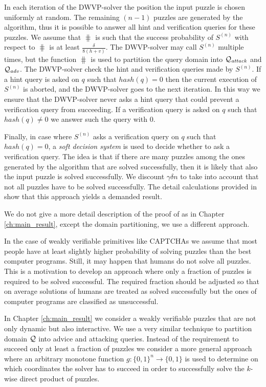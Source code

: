 In each iteration of the DWVP-solver the position the input puzzle is chosen uniformly at random.
The remaining $(n-1)$ puzzles are generated by the algorithm, thus it is possible to answer
all hint and verification queries for these puzzles.
We assume that $\hash$ is such that the success probability of $S^{(n)}$ with respect to $\hash$ is at least $\frac{\delta}{8(h+v)}$.
The DWVP-solver may call $S^{(n)}$ multiple times, but the function $\hash$ is used
to partition the query domain into $\mathcal{Q}_{\mathit{attack}}$ and $\mathcal{Q}_{\mathit{adv}}$. The DWVP-solver check the hint and verification queries made by $S^{(n)}$.
If a hint query is asked on $q$ such that $hash(q) = 0$ then the current execution of $S^{(n)}$
is aborted, and the DWVP-solver goes to the next iteration.
In this way we ensure that the DWVP-solver never asks a hint query that could prevent a verification query from succeeding.
If a verification query is asked on $q$ such that $hash(q) \neq 0$ we answer such the query with $0$.

Finally, in case where $S^{(n)}$ asks a verification query on $q$ such that $hash(q) = 0$,
a \textit{soft decision system} is used to decide whether to ask a verification query.
The idea is that if there are many puzzles among the ones generated by the algorithm that are solved successfully,
then it is likely that also the input puzzle is solved successfully.
We discount $\gamma\delta n$ to take into account that not all puzzles have to be solved successfully.
The detail calculations provided in \cite{Dodis:2009:SAI:1530441.1530450} show that this approach
yields a demanded result.

We do not give a more detail description of the proof of \cite{Dodis:2009:SAI:1530441.1530450} as
in Chapter \ref{ch:main_result}, except the domain partitioning, we use a different approach.

In the case of weakly verifiable primitives like CAPTCHAs we assume that most people have at least slightly higher probability of solving
puzzles than the best computer programs. Still, it may happen that humans do not solve all puzzles.
This is a motivation to develop an approach where only a fraction of puzzles is required to be solved successful.
The required fraction should be adjusted so that on average solutions of humans are treated as solved successfully
but the ones of computer programs are classified as unsuccessful.

In Chapter \ref{ch:main_result} we consider a weakly verifiable puzzles that are not only dynamic but also interactive.
We use a very similar technique to partition domain $\mathcal{Q}$ into advice and attacking queries.
Instead of the requirement to succeed only at least a fraction of puzzles we consider a more general approach where
an arbitrary monotone function $g : \{0,1\}^{n} \rightarrow \{0,1\}$ is used to
determine on which coordinates the solver has to succeed in order to successfully solve the $k$-wise direct product of puzzles.

